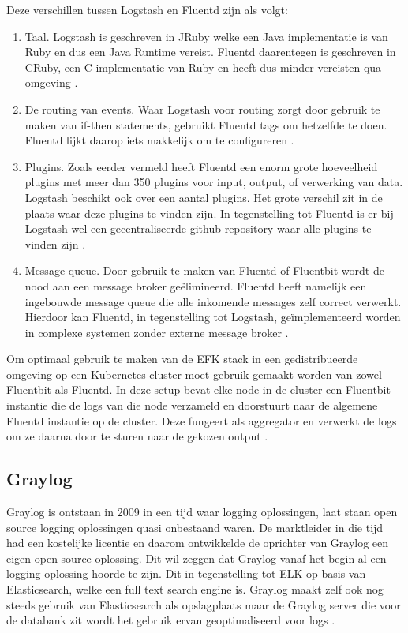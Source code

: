 Deze verschillen tussen Logstash en Fluentd zijn als volgt:
\begin{enumerate}
    \item Taal. Logstash is geschreven in JRuby welke een Java implementatie is van Ruby en dus een Java Runtime vereist. Fluentd daarentegen is geschreven in CRuby, een C implementatie van Ruby en heeft dus minder vereisten qua omgeving \autocite{harikumar2018}.
    \item De routing van events. Waar Logstash voor routing zorgt door gebruik te maken van if-then statements, gebruikt Fluentd tags om hetzelfde te doen. Fluentd lijkt daarop iets makkelijk om te configureren \autocite{harikumar2018}.
    \item Plugins. Zoals eerder vermeld heeft Fluentd een enorm grote hoeveelheid plugins met meer dan 350 plugins voor input, output, of verwerking van data. Logstash beschikt ook over een aantal plugins. Het grote verschil zit in de plaats waar deze plugins te vinden zijn. In tegenstelling tot Fluentd is er bij Logstash wel een gecentraliseerde github repository waar alle plugins te vinden zijn \autocite{harikumar2018}.
    \item Message queue. Door gebruik te maken van Fluentd of Fluentbit wordt de nood aan een message broker geëlimineerd. Fluentd heeft namelijk een ingebouwde message queue die alle inkomende messages zelf correct verwerkt. Hierdoor kan Fluentd, in tegenstelling tot Logstash, geïmplementeerd worden in complexe systemen zonder externe message broker \autocite{harikumar2018}. 
\end{enumerate}

Om optimaal gebruik te maken van de EFK stack in een gedistribueerde omgeving op een Kubernetes cluster moet gebruik gemaakt worden van zowel Fluentbit als Fluentd. In deze setup bevat elke node in de cluster een Fluentbit instantie die de logs van die node verzameld en doorstuurt naar de algemene Fluentd instantie op de cluster. Deze fungeert als aggregator en verwerkt de logs om ze daarna door te sturen naar de gekozen output \autocite{berman2018-06}.

\subsection{Graylog}
Graylog is ontstaan in 2009 in een tijd waar logging oplossingen, laat staan open source logging oplossingen quasi onbestaand waren. De marktleider in die tijd had een kostelijke licentie en daarom ontwikkelde de oprichter van Graylog een eigen open source oplossing. Dit wil zeggen dat Graylog vanaf het begin al een logging oplossing hoorde te zijn. Dit in tegenstelling tot ELK op basis van Elasticsearch, welke een full text search engine is. Graylog maakt zelf ook nog steeds gebruik van Elasticsearch als opslagplaats maar de Graylog server die voor de databank zit wordt het gebruik ervan geoptimaliseerd voor logs \autocite{graylog}.


